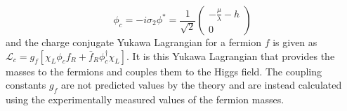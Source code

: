 \begin{equation}
	\phi_c=-i\sigma_2\phi^*=\frac{1}{\sqrt{2}}\begin{pmatrix}-\frac{\mu}{\lambda}-h\\0\end{pmatrix}
\end{equation}
and the charge conjugate Yukawa Lagrangian for a fermion $f$ is given as $\mathcal{L}_c=g_f[\chi_L\phi_cf_R+\bar{f}_R\phi_c^\dagger\chi_L]$. It is this Yukawa Lagrangian that provides the masses to the fermions and couples them to the Higgs field. The coupling constants $g_f$ are not predicted values by the theory and are instead calculated using the experimentally measured values of the fermion masses.
